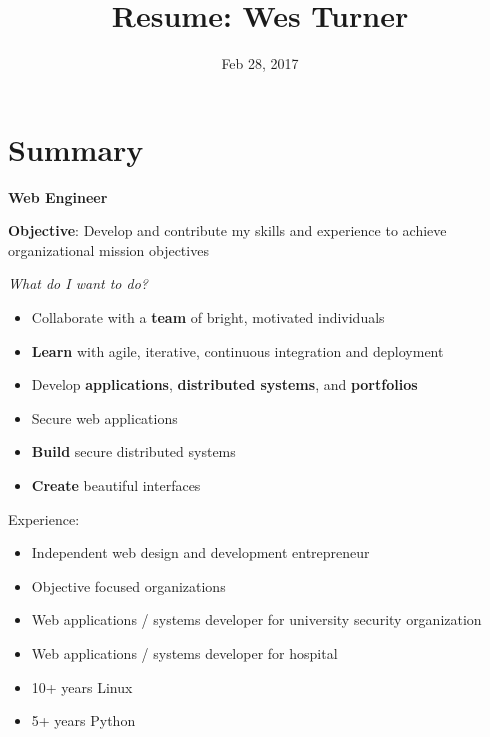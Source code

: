 \documentclass[letter,,openany,oneside]{sphinxhowto}
\title{Resume: Wes Turner}
\date{Feb 28, 2017}
\author{}
\begin{document}
\maketitle
\tableofcontents
{}\label{resume::doc}

\newpage

\section{Summary}
\label{resume:summary}\label{resume:id1}
\textbf{Web Engineer}

\textbf{Objective}: Develop and contribute my skills and experience to
achieve organizational mission objectives

\emph{What do I want to do?}
\begin{itemize}
\item {} 
Collaborate with a \textbf{team} of bright, motivated individuals

\item {} 
\textbf{Learn} with agile, iterative, continuous integration and deployment

\item {} 
Develop \textbf{applications}, \textbf{distributed systems}, and \textbf{portfolios}

\item {} 
Secure web applications

\item {} 
\textbf{Build} secure distributed systems

\item {} 
\textbf{Create} beautiful interfaces

\end{itemize}

Experience:
\begin{itemize}
\item {} 
Independent web design and development entrepreneur

\item {} 
Objective focused organizations

\item {} 
Web applications / systems developer for university security organization

\item {} 
Web applications / systems developer for hospital

\item {} 
10+ years Linux

\item {} 
5+ years Python

\end{itemize}
\newpage
\end{document}
